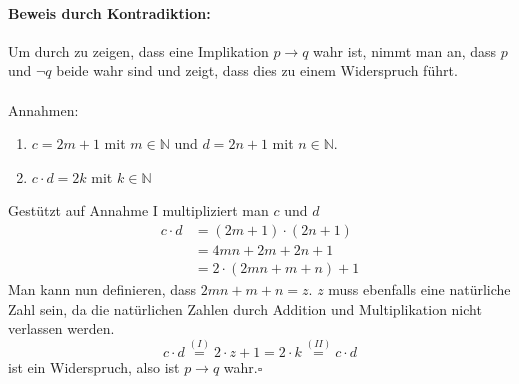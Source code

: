 \documentclass[12pt,a4paper]{article}
\begin{document}
\begin{enumerate}[a)]
\paragraph{Beweis durch Kontradiktion: } Um durch zu zeigen, dass eine Implikation $p\rightarrow q$ wahr ist, nimmt man an, dass $p$ und $\neg q$ beide wahr sind und zeigt, dass dies zu einem Widerspruch führt.\\
\\
Annahmen: 
\begin{enumerate}[I]
\item $c = 2m+1$ mit $m\in\mathbb{N}$ und $d = 2n+1$ mit $n\in\mathbb{N}$.
\item $c\cdot d = 2k$ mit $k\in\mathbb{N}$ 
\end{enumerate}
Gestützt auf Annahme I multipliziert man $c$ und $d$
\begin{align*}
c\cdot d &= (2m+1)\cdot(2n+1)\\
&=4mn + 2m + 2n + 1\\
&=2\cdot (2mn + m + n) + 1
\end{align*}
Man kann nun definieren, dass $2mn+m+n=z$. $z$ muss ebenfalls eine natürliche Zahl sein, da die natürlichen Zahlen durch Addition und Multiplikation nicht verlassen werden.\\
$$c \cdot d \overset{(I)}{=} 2\cdot z + 1 = 2 \cdot k \overset{(II)}{=} c\cdot d$$
ist ein Widerspruch, also ist $p\rightarrow q$ wahr.\hfill$\square$

\end{enumerate}
\end{document}
